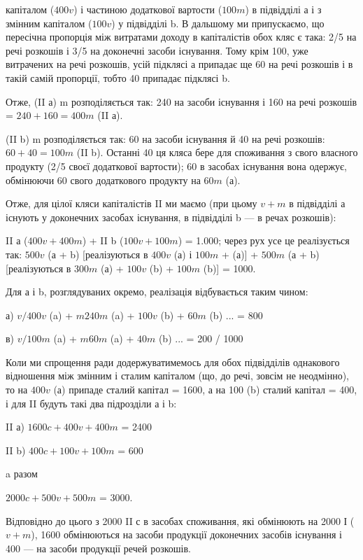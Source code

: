 \parcont{}  %
капіталом ($400 v$) і частиною додаткової вартости ($100 m$) в підвідділі а
і з змінним капіталом ($100 v$) у підвідділі b. В дальшому ми припускаємо,
що пересічна пропорція між витратами доходу в капіталістів обох кляс
є така: 2/5 на речі розкошів і 3/5 на доконечні засоби існування.
Тому крім 100, уже витрачених на речі розкошів, усій підклясі а припадає
ще 60 на речі розкошів і в такій самій пропорції, тобто 40 припадає
підклясі b.

Отже, (II а) m розподіляється так: 240 на засоби існування і 160 на
речі розкошів = $240 + 160 = 400 m$ (II а).

(II b) m розподіляється так: 60 на засоби існування й 40 на речі
розкошів: $60 + 40 = 100 m$ (II b). Останні 40 ця кляса бере для споживання
з свого власного продукту (2/5 своєї додаткової вартости); 60 в
засобах існування вона одержує, обмінюючи 60 свого додаткового продукту
на $60 m$ (а).

Отже, для цілої кляси капіталістів II ми маємо (при цьому $v + m$ в
підвідділі а існують у доконечних засобах існування, в підвідділі b — в
речах розкошів):

II а ($400 v + 400 m$) + II b ($100 v + 100 m$) = 1.000; через рух усе
це реалізується так: $500 v$ (а + b) [реалізуються в $400 v$ (а) і $100 m$ + (а)] +
$500m$ (а + b) [реалізуються в $300 m$ (а) + $100 v$ (b) + $100 m$ (b)] =
1000.

Для а і b, розглядуваних окремо, реалізація відбувається таким
чином:

а) $v / 400 v$ (a) + $m 240 m$ (a) + $100 v$ (b) + $60 m$ (b) ... = 800

в) $v / 100 m$ (a) + $m 60 m$ (a) + $40 m$ (b) ... = 200 / 1000

Коли ми спрощення ради додержуватимемось для обох підвідділів однакового
відношення між змінним і сталим капіталом (що, до речі, зовсім не неодмінно),
то на $400 v$ (а) припаде сталий капітал = 1600, а на 100 (b)
сталий капітал = 400, і для II будуть такі два підрозділи а і b:

II а) $1600 c + 400 v + 400 m$ = 2400

II b) $400 c + 100 v + 100 m$ = 600

a разом

$2000 c + 500 v + 500 m$ = 3000.

Відповідно до цього з 2000 II с в засобах споживання, які обмінюють
на 2000 І ($v + m$), 1600 обмінюються на засоби продукції доконечних
засобів існування і 400 — на засоби продукції речей розкошів.

